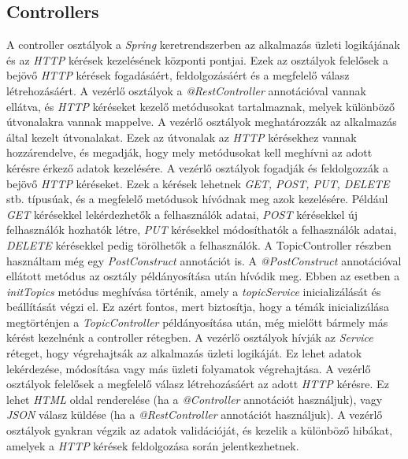 \newpage

\subsection{Controllers}


A controller osztályok a \textit{Spring} keretrendszerben az alkalmazás üzleti logikájának és az \textit{HTTP} kérések kezelésének központi pontjai. Ezek az osztályok felelősek a bejövő \textit{HTTP} kérések fogadásáért, feldolgozásáért és a megfelelő válasz létrehozásáért. A vezérlő osztályok a \textit{@RestController} annotációval vannak ellátva, és \textit{HTTP} kéréseket kezelő metódusokat tartalmaznak, melyek különböző útvonalakra vannak mappelve. A vezérlő osztályok meghatározzák az alkalmazás által kezelt útvonalakat. Ezek az útvonalak az \textit{HTTP} kérésekhez vannak hozzárendelve, és megadják, hogy mely metódusokat kell meghívni az adott kérésre érkező adatok kezelésére. A vezérlő osztályok fogadják és feldolgozzák a bejövő \textit{HTTP} kéréseket. Ezek a kérések lehetnek \textit{GET, POST, PUT, DELETE} stb. típusúak, és a megfelelő metódusok hívódnak meg azok kezelésére. Például \textit{GET} kérésekkel lekérdezhetők a felhasználók adatai, \textit{POST} kérésekkel új felhasználók hozhatók létre, \textit{PUT} kérésekkel módosíthatók a felhasználók adatai, \textit{DELETE} kérésekkel pedig törölhetők a felhasználók. A TopicController részben használtam még egy \textit{PostConstruct} annotációt is. A \textit{@PostConstruct} annotációval ellátott metódus az osztály példányosítása után hívódik meg. Ebben az esetben a \textit{initTopics} metódus meghívása történik, amely a \textit{topicService} inicializálását és beállítását végzi el. Ez azért fontos, mert biztosítja, hogy a témák inicializálása megtörténjen a \textit{TopicController} példányosítása után, még mielőtt bármely más kérést kezelnénk a controller rétegben. A vezérlő osztályok hívják az \textit{Service} réteget, hogy végrehajtsák az alkalmazás üzleti logikáját. Ez lehet adatok lekérdezése, módosítása vagy más üzleti folyamatok végrehajtása. A vezérlő osztályok felelősek a megfelelő válasz létrehozásáért az adott \textit{HTTP} kérésre. Ez lehet \textit{HTML} oldal renderelése (ha a \textit{@Controller} annotációt használjuk), vagy \textit{JSON} válasz küldése (ha a \textit{@RestController} annotációt használjuk). A vezérlő osztályok gyakran végzik az adatok validációját, és kezelik a különböző hibákat, amelyek a \textit{HTTP} kérések feldolgozása során jelentkezhetnek.

